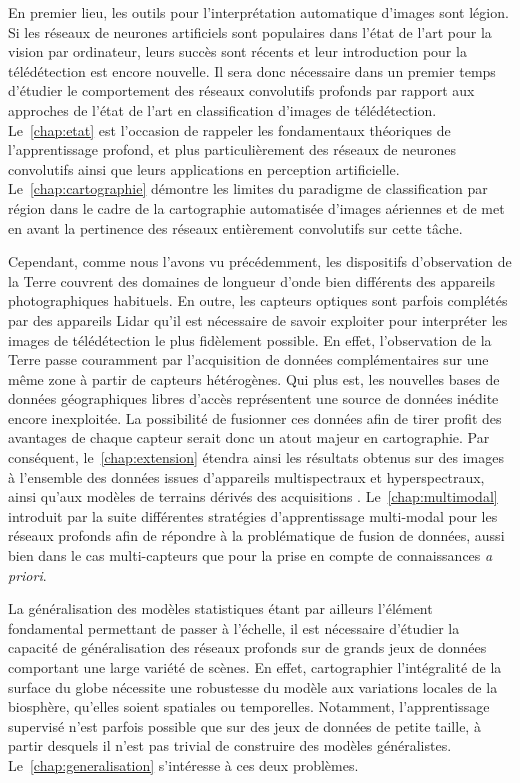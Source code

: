 En premier lieu, les outils pour l'interprétation automatique d'images sont légion. Si les réseaux de neurones artificiels sont populaires dans l'état de l'art pour la vision par ordinateur, leurs succès sont récents et leur introduction pour la télédétection est encore nouvelle. Il sera donc nécessaire dans un premier temps d'étudier le comportement des réseaux convolutifs profonds par rapport aux approches de l'état de l'art en classification d'images de télédétection. Le~\cref{chap:etat} est l'occasion de rappeler les fondamentaux théoriques de l'apprentissage profond, et plus particulièrement des réseaux de neurones convolutifs ainsi que leurs applications en perception artificielle. Le~\cref{chap:cartographie} démontre les limites du paradigme de classification par région dans le cadre de la cartographie automatisée d'images aériennes et de met en avant la pertinence des réseaux entièrement convolutifs sur cette tâche.

Cependant, comme nous l'avons vu précédemment, les dispositifs d'observation de la Terre couvrent des domaines de longueur d'onde bien différents des appareils photographiques habituels. En outre, les capteurs optiques sont parfois complétés par des appareils Lidar qu'il est nécessaire de savoir exploiter pour interpréter les images de télédétection le plus fidèlement possible. En effet, l'observation de la Terre passe couramment par l'acquisition de données complémentaires sur une même zone à partir de capteurs hétérogènes. Qui plus est, les nouvelles bases de données géographiques libres d'accès représentent une source de données inédite encore inexploitée. La possibilité de fusionner ces données afin de tirer profit des avantages de chaque capteur serait donc un atout majeur en cartographie. Par conséquent, le~\cref{chap:extension} étendra ainsi les résultats obtenus sur des images  à l'ensemble des données issues d'appareils multispectraux et hyperspectraux, ainsi qu'aux modèles de terrains dérivés des acquisitions . Le~\cref{chap:multimodal} introduit par la suite différentes stratégies d'apprentissage multi-modal pour les réseaux profonds afin de répondre à la problématique de fusion de données, aussi bien dans le cas multi-capteurs que pour la prise en compte de connaissances \emph{a priori}.

La généralisation des modèles statistiques étant par ailleurs l'élément fondamental permettant de passer à l'échelle, il est nécessaire d'étudier la capacité de généralisation des réseaux profonds sur de grands jeux de données comportant une large variété de scènes. En effet, cartographier l'intégralité de la surface du globe nécessite une robustesse du modèle aux variations locales de la biosphère, qu'elles soient spatiales ou temporelles. Notamment, l'apprentissage supervisé n'est parfois possible que sur des jeux de données de petite taille, à partir desquels il n'est pas trivial de construire des modèles généralistes. Le~\cref{chap:generalisation} s'intéresse à ces deux problèmes.

